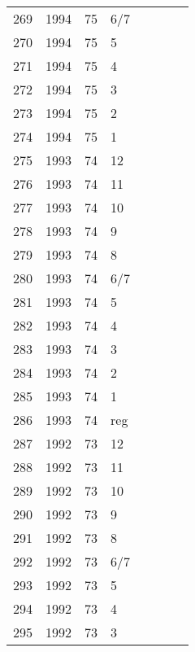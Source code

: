 \begin{longtable}{ |l|l|l|l|l|l|l|l| }
269 & 1994 & 75 &   6/7 &         &                &  & \\
270 & 1994 & 75 &     5 &         &                &   & \\
271 & 1994 & 75 &     4 &         &                &  & \\
272 & 1994 & 75 &     3 &         &                &  & \\
273 & 1994 & 75 &     2 &         &                &  & \\
274 & 1994 & 75 &     1 &         &                &  & \\
275 & 1993 & 74 &    12 &         &                &  & \\
276 & 1993 & 74 &    11 &         &                &  & \\
277 & 1993 & 74 &    10 &         &                &  & \\
278 & 1993 & 74 &     9 &         &                &  & \\
279 & 1993 & 74 &     8 &         &                &  & \\
280 & 1993 & 74 &   6/7 &         &                &  & \\
281 & 1993 & 74 &     5 &         &                &  & \\
282 & 1993 & 74 &     4 &         &                &  & \\
283 & 1993 & 74 &     3 &         &                &  & \\
284 & 1993 & 74 &     2 &         &                &  & \\
285 & 1993 & 74 &     1 &         &                &  & \\
286 & 1993 & 74 &   reg &         &                &  & \\
287 & 1992 & 73 &    12 &         &                &  & \\
288 & 1992 & 73 &    11 &         &                &  & \\
289 & 1992 & 73 &    10 &         &                &  & \\
290 & 1992 & 73 &     9 &         &                &  & \\
291 & 1992 & 73 &     8 &         &                &  & \\
292 & 1992 & 73 &   6/7 &         &                &  & \\
293 & 1992 & 73 &     5 &         &                &  & \\
294 & 1992 & 73 &     4 &         &                &  & \\
295 & 1992 & 73 &     3 &         &                &  & \\

\end{longtable}
